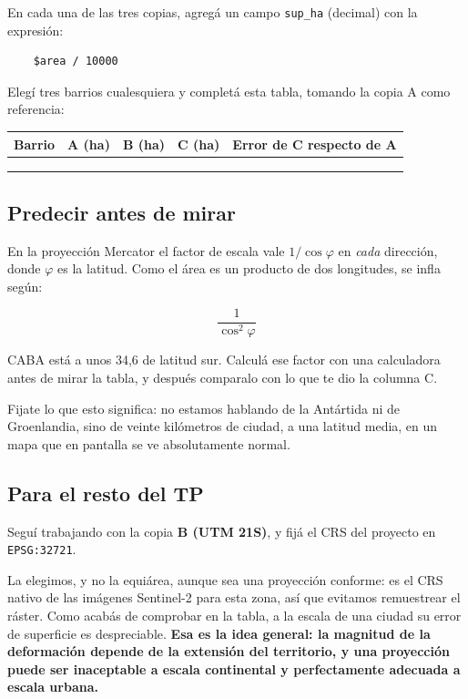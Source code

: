 \documentclass{article}
\begin{document}
En cada una de las tres copias, agregá un campo \texttt{sup\_ha} (decimal) con la expresión:

\begin{verbatim}
    $area / 10000
\end{verbatim}

Elegí tres barrios cualesquiera y completá esta tabla, tomando la copia A como referencia:

\begin{center}
\begin{tabular}{lcccc}
    \toprule
    Barrio & A (ha) & B (ha) & C (ha) & Error de C respecto de A \\
    \midrule
    \\[-2ex]
    \\[-2ex]
    \\[-2ex]
    \bottomrule
\end{tabular}
\end{center}

\subsection{Predecir antes de mirar}

En la proyección Mercator el factor de escala vale $1/\cos\varphi$ en \emph{cada} dirección, donde $\varphi$ es la latitud. Como el área es un producto de dos longitudes, se infla según:

\begin{equation*}
    \frac{1}{\cos^{2}\varphi}
\end{equation*}

CABA está a unos 34,6\textdegree{} de latitud sur. Calculá ese factor con una calculadora antes de mirar la tabla, y después comparalo con lo que te dio la columna C.

Fijate lo que esto significa: no estamos hablando de la Antártida ni de Groenlandia, sino de veinte kilómetros de ciudad, a una latitud media, en un mapa que en pantalla se ve absolutamente normal.

\subsection{Para el resto del TP}

Seguí trabajando con la copia \textbf{B (UTM 21S)}, y fijá el CRS del proyecto en \texttt{EPSG:32721}.

La elegimos, y no la equiárea, aunque sea una proyección conforme: es el CRS nativo de las imágenes Sentinel-2 para esta zona, así que evitamos remuestrear el ráster. Como acabás de comprobar en la tabla, a la escala de una ciudad su error de superficie es despreciable. \textbf{Esa es la idea general: la magnitud de la deformación depende de la extensión del territorio, y una proyección puede ser inaceptable a escala continental y perfectamente adecuada a escala urbana.}
\end{document}
